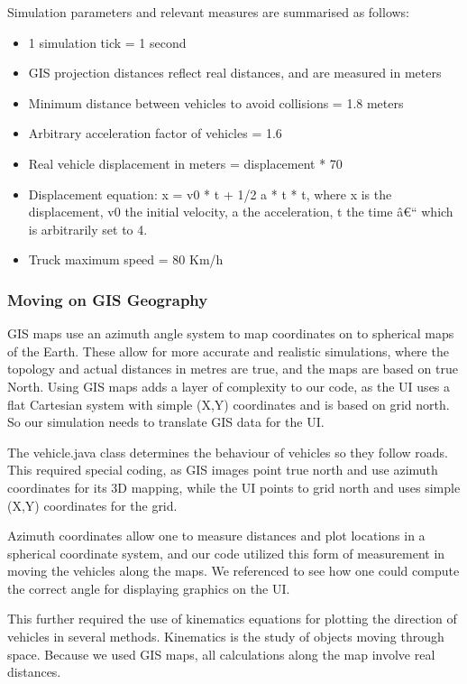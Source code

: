\documentclass[11pt]{article}
\begin{document}
Simulation parameters and relevant measures are summarised as follows:
\begin{itemize}
\item 1 simulation tick = 1 second
\item GIS projection distances reflect real distances, and are measured in meters
\item Minimum distance between vehicles to avoid collisions = 1.8 meters
\item Arbitrary acceleration factor of vehicles = 1.6
\item Real vehicle displacement in meters = displacement * 70
\item Displacement equation: x = v0 * t + 1/2 a * t * t, where x is the displacement, v0 the initial velocity, a the acceleration, t the time â€“ which is arbitrarily set to 4.
\item Truck maximum speed = 80 Km/h
\end{itemize}



\subsubsection{Moving on GIS Geography}


GIS maps use an azimuth angle system to map coordinates on to spherical maps of the Earth. These allow for more accurate and realistic simulations, where the topology and actual distances in metres are true, and the maps are based on true North. Using GIS maps adds a layer of complexity to our code, as the UI uses a flat Cartesian system with simple (X,Y) coordinates and is based on grid north. So our simulation needs to translate GIS data for the UI.



The vehicle.java class determines the behaviour of vehicles so they follow roads. This required special coding, as GIS images point true north and use azimuth coordinates for its 3D mapping, while the UI points to grid north and uses simple (X,Y) coordinates for the grid. 

Azimuth coordinates allow one to measure distances and plot locations in a spherical coordinate system, and our code utilized this form of measurement in moving the vehicles along the maps. We referenced \cite{9i} to see how one could compute the correct angle for displaying graphics on the UI. 

This further required the use of kinematics equations for plotting the direction of vehicles in several methods. Kinematics is the study of objects moving through space. Because we used GIS maps, all calculations along the map involve real distances.
\\
\end{document}
